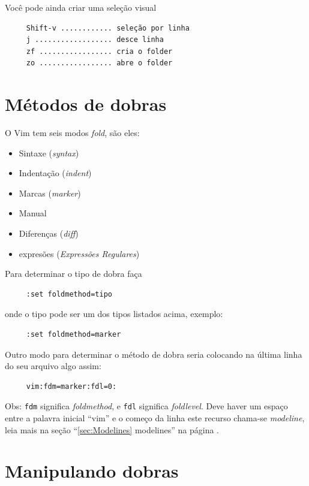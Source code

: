 \documentclass[10pt,a4paper,openany]{book}
\begin{document}
Você pode ainda criar uma seleção visual

\begin{verbatim}
     Shift-v ............ seleção por linha
     j .................. desce linha
     zf ................. cria o folder
     zo ................. abre o folder
\end{verbatim}

\section{Métodos de dobras }
\label{Métodos de dobras }
O Vim tem seis modos {\em fold}, são eles:

\begin{itemize}
\item Sintaxe ({\em syntax})
\item Indentação ({\em indent})
\item Marcas ({\em marker})
\item Manual
\item Diferenças ({\em diff})
\item expresões ({\em Expressões Regulares})
\end{itemize}

Para determinar o tipo de dobra faça

\begin{verbatim}
     :set foldmethod=tipo
\end{verbatim}

onde o tipo pode ser um dos tipos listados acima, exemplo:

\begin{verbatim}
     :set foldmethod=marker
\end{verbatim}

Outro modo para determinar o método de dobra seria colocando na última
linha do seu arquivo algo assim:

\begin{verbatim}
     vim:fdm=marker:fdl=0:
\end{verbatim}

Obs: \verb|fdm| significa {\em foldmethod}, e \verb|fdl| significa
{\em foldlevel}. Deve haver um espaço entre a palavra inicial ``vim'' e o
começo da linha este recurso chama-se {\em modeline}, leia mais na seção
``\ref{sec:Modelines} modelines'' na página \pageref{sec:Modelines}.

\section{Manipulando dobras }\label{Manipulando dobras }
\end{document}
